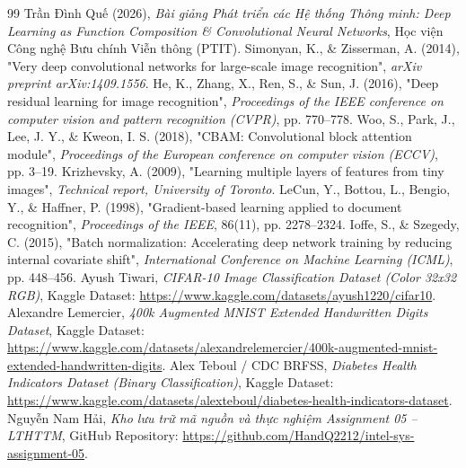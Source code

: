 \documentclass[12pt,a4paper]{article}
\begin{document}
\newpage
{}
{}
\begin{thebibliography}{99}
 Trần Đình Quế (2026), \textit{Bài giảng Phát triển các Hệ thống Thông minh: Deep Learning as Function Composition \& Convolutional Neural Networks}, Học viện Công nghệ Bưu chính Viễn thông (PTIT).
 Simonyan, K., \& Zisserman, A. (2014), "Very deep convolutional networks for large-scale image recognition", \textit{arXiv preprint arXiv:1409.1556}.
 He, K., Zhang, X., Ren, S., \& Sun, J. (2016), "Deep residual learning for image recognition", \textit{Proceedings of the IEEE conference on computer vision and pattern recognition (CVPR)}, pp. 770--778.
 Woo, S., Park, J., Lee, J. Y., \& Kweon, I. S. (2018), "CBAM: Convolutional block attention module", \textit{Proceedings of the European conference on computer vision (ECCV)}, pp. 3--19.
 Krizhevsky, A. (2009), "Learning multiple layers of features from tiny images", \textit{Technical report, University of Toronto}.
 LeCun, Y., Bottou, L., Bengio, Y., \& Haffner, P. (1998), "Gradient-based learning applied to document recognition", \textit{Proceedings of the IEEE}, 86(11), pp. 2278--2324.
 Ioffe, S., \& Szegedy, C. (2015), "Batch normalization: Accelerating deep network training by reducing internal covariate shift", \textit{International Conference on Machine Learning (ICML)}, pp. 448--456.
 Ayush Tiwari, \textit{CIFAR-10 Image Classification Dataset (Color 32x32 RGB)}, Kaggle Dataset: \url{https://www.kaggle.com/datasets/ayush1220/cifar10}.
 Alexandre Lemercier, \textit{400k Augmented MNIST Extended Handwritten Digits Dataset}, Kaggle Dataset: \url{https://www.kaggle.com/datasets/alexandrelemercier/400k-augmented-mnist-extended-handwritten-digits}.
 Alex Teboul / CDC BRFSS, \textit{Diabetes Health Indicators Dataset (Binary Classification)}, Kaggle Dataset: \url{https://www.kaggle.com/datasets/alexteboul/diabetes-health-indicators-dataset}.
 Nguyễn Nam Hải, \textit{Kho lưu trữ mã nguồn và thực nghiệm Assignment 05 -- LTHTTM}, GitHub Repository: \url{https://github.com/HandQ2212/intel-sys-assignment-05}.
\end{thebibliography}
\end{document}

